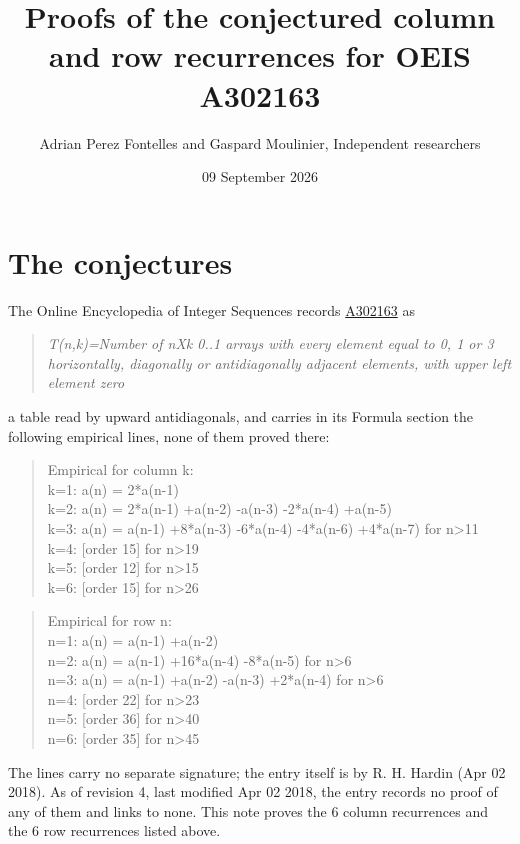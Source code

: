 \documentclass[11pt]{article}
\title{Proofs of the conjectured column and row recurrences for OEIS A302163}
\author{Adrian Perez Fontelles and Gaspard Moulinier, Independent researchers}
\date{09 September 2026}
\theoremstyle{definition}
\begin{document}
\maketitle
\section{The conjectures}

The Online Encyclopedia of Integer Sequences records \href{https://oeis.org/A302163}{A302163} as

\begin{quote}\itshape T(n,k)=Number of nXk 0..1 arrays with every element equal to 0, 1 or 3 horizontally, diagonally or antidiagonally adjacent elements, with upper left element zero\end{quote}

a table read by upward antidiagonals, and carries in its Formula section the following empirical lines, none of them proved there:

\begin{quote}\ttfamily Empirical for column k:\\
k=1: a(n) = 2*a(n-1)\\k=2: a(n) = 2*a(n-1) +a(n-2) -a(n-3) -2*a(n-4) +a(n-5)\\k=3: a(n) = a(n-1) +8*a(n-3) -6*a(n-4) -4*a(n-6) +4*a(n-7) for n>11\\k=4: [order 15] for n>19\\k=5: [order 12] for n>15\\k=6: [order 15] for n>26\end{quote}

\begin{quote}\ttfamily Empirical for row n:\\
n=1: a(n) = a(n-1) +a(n-2)\\n=2: a(n) = a(n-1) +16*a(n-4) -8*a(n-5) for n>6\\n=3: a(n) = a(n-1) +a(n-2) -a(n-3) +2*a(n-4) for n>6\\n=4: [order 22] for n>23\\n=5: [order 36] for n>40\\n=6: [order 35] for n>45\end{quote}

The lines carry no separate signature; the entry itself is by R. H. Hardin (Apr 02 2018). As of revision 4, last modified Apr 02 2018, the entry records no proof of any of them and links to none. This note proves the 6 column recurrences and the 6 row recurrences listed above.
\end{document}

